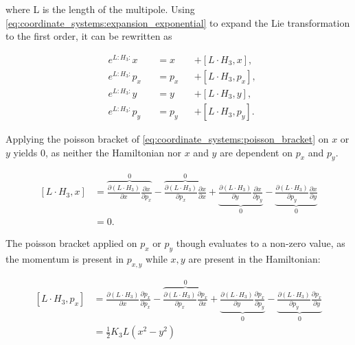where L is the length of the multipole. 
Using \cref{eq:coordinate_systems:expansion_exponential} to expand the Lie transformation to the
first order, it can be rewritten as

\begin{equation}
    \begin{alignedat}{3}
        &e^{L:H_3:} x   &&= x   &&+ [L \cdot H_3, x], \\
        &e^{L:H_3:} p_x &&= p_x &&+ [L \cdot H_3, p_x], \\
        &e^{L:H_3:} y   &&= y   &&+ [L \cdot H_3, y], \\
        &e^{L:H_3:} p_y &&= p_y &&+ [L \cdot H_3, p_y].
        \label{eq:coordinate_systems:lie_exponential_first_order_sextupole}
    \end{alignedat}
\end{equation}

Applying the poisson bracket of \cref{eq:coordinate_systems:poisson_bracket} on $x$ or $y$ yields
$0$, as neither the Hamiltonian nor $x$ and $y$ are dependent on $p_x$ and $p_y$.

\begin{equation}
  \begin{aligned}
    [L \cdot H_3, x] &= 
       \overbrace{\frac{\partial (L \cdot H_3)}{\partial x} \frac{\partial x}{\partial p_x}}^{0}
       - \overbrace{\frac{\partial (L \cdot H_3)}{\partial p_x} \frac{\partial x}{\partial x}}^{0}
       + \underbrace{\frac{\partial (L \cdot H_3)}{\partial y} \frac{\partial x}{\partial p_y}}_0
       - \underbrace{\frac{\partial (L \cdot H_3)}{\partial p_y} \frac{\partial x}{\partial y}}_0 \\
                    &= 0.
  \end{aligned}
  \label{eq:coordinate_systems:sextupole_transfer_x_poisson}
\end{equation}


The poisson bracket applied on $p_x$ or $p_y$ though evaluates to a non-zero value, as the momentum
is present in $p_{x, y}$ while $x, y$ are present in the Hamiltonian:

\begin{equation}
  \begin{aligned}
    [L \cdot H_3, p_x] &=
       \frac{\partial (L \cdot H_3)}{\partial x} \frac{\partial p_x}{\partial p_x}
     - \overbrace{\frac{\partial (L \cdot H_3)}{\partial p_x} \frac{\partial p_x}{\partial x}}^{0}
     + \underbrace{\frac{\partial (L \cdot H_3)}{\partial y} \frac{\partial p_x}{\partial p_y}}_0
     - \underbrace{\frac{\partial (L \cdot H_3)}{\partial p_y} \frac{\partial p_x}{\partial y}}_0 \\
                        & = \frac{1}{2} K_3 L (x^2 - y^2)
  \end{aligned}
  \label{eq:coordinate_systems:sextupole_transfer_px_poisson}
\end{equation}

